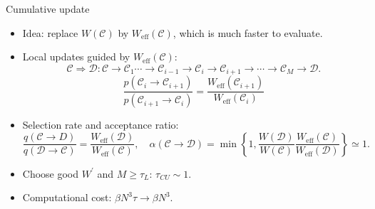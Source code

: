 \documentclass[xcolor=table, 10pt, aspectratio=169]{beamer}
\begin{document}
\begin{frame}{Cumulative update}
  \begin{itemize}
    \item Idea: replace $W(\mathcal C)$ by $W_{\text{eff}}(\mathcal C)$, which is much faster to evaluate.
    \item Local updates guided by $W_{\text{eff}}(\mathcal C)$:
    \[\mathcal C\Rightarrow\mathcal D:
    \mathcal C\rightarrow\mathcal C_1\cdots\rightarrow\mathcal C_{i-1}\rightarrow\mathcal C_i\rightarrow\mathcal C_{i+1}\rightarrow\cdots\rightarrow\mathcal C_M\rightarrow\mathcal D.\]
    \[\frac{p(\mathcal C_i\rightarrow\mathcal C_{i+1})}{p(\mathcal C_{i+1}\rightarrow\mathcal C_i)}=\frac{W_{\text{eff}}(\mathcal C_{i+1})}{W_{\text{eff}}(\mathcal C_i)}\]
    \item Selection rate and acceptance ratio:
    \[\frac{q(\mathcal C\rightarrow D)}
    {q(\mathcal D\rightarrow\mathcal C)}
    =\frac{W_{\text{eff}}(\mathcal D)}{W_{\text{eff}}(\mathcal C)},\quad
    \alpha(\mathcal C\rightarrow \mathcal D)=\min\left\{1, \frac{W(\mathcal D)}{W(\mathcal C)}
    \frac{W_{\text{eff}}(\mathcal C)}{W_{\text{eff}}(\mathcal D)}\right\}\simeq1.\]
		\item Choose good $W^\prime$ and $M\geq\tau_L$: $\tau_{CU}\sim1$.
    \item Computational cost: $\beta N^3\tau\rightarrow \beta N^3$.
  \end{itemize}
\end{frame}
\end{document}
